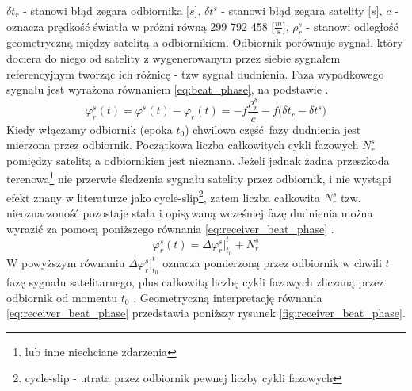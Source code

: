 ${\delta}t_r$ - stanowi błąd zegara odbiornika $\big[s\big]$,\newline
${\delta}t^s$ - stanowi błąd zegara satelity $\big[s\big]$,\newline
$c$ - oznacza prędkość światła w próżni równą 299 792 458 $\big[\frac{m}{s}\big]$,\newline
$\rho_r^s$ - stanowi odległość geometryczną między satelitą a odbiornikiem.\newline
Odbiornik porównuje sygnał, który dociera do niego od satelity z wygenerowanym przez siebie sygnałem referencyjnym tworząc ich różnicę - tzw sygnał dudnienia.
Faza wypadkowego sygnału jest wyrażona równaniem \ref{eq:beat_phase}, na podstawie \cite[][strona 106]{hofmann_gnss}.
\begin{equation}
	{\varphi}_r^s(t) = {\varphi}^s(t) - {\varphi}_r(t) = - f\frac{\rho_r^s}{c} - f\big({\delta}t_r - {\delta}t^s\big)
	\label{eq:beat_phase}
\end{equation}
Kiedy włączamy odbiornik (epoka $t_0$) chwilowa część fazy dudnienia jest mierzona przez odbiornik. Początkowa liczba całkowitych cykli fazowych $N_r^s$ pomiędzy satelitą 
a odbiornikien jest nieznana. Jeżeli jednak żadna przeszkoda terenowa\footnote{lub inne niechciane zdarzenia} nie przerwie śledzenia sygnału satelity przez odbiornik,
i nie wystąpi efekt znany w literaturze jako cycle-slip\footnote{cycle-slip - utrata przez odbiornik pewnej liczby cykli fazowych}, zatem liczba całkowita $N_r^s$
tzw. nieoznaczoność pozostaje stała i opisywaną wcześniej fazę dudnienia można wyrazić za pomocą poniższego równania \ref{eq:receiver_beat_phase}
\cite[][strona 107]{hofmann_gnss}.
\begin{equation}
	{\varphi}_r^s(t) = \Delta{\varphi}_r^s\big|_{t_0}^{t} + N_r^s
	\label{eq:receiver_beat_phase}
\end{equation}
W powyższym równaniu $\Delta{\varphi}_r^s\big|_{t_0}^{t}$ oznacza pomierzoną przez odbiornik w chwili $t$ fazę sygnału satelitarnego, plus całkowitą liczbę cykli 
fazowych zliczaną przez odbiornik od momentu $t_0$ \cite[][strona 107]{hofmann_gnss}.
Geometryczną interpretację równania \ref{eq:receiver_beat_phase} przedstawia poniższy rysunek \ref{fig:receiver_beat_phase}.

